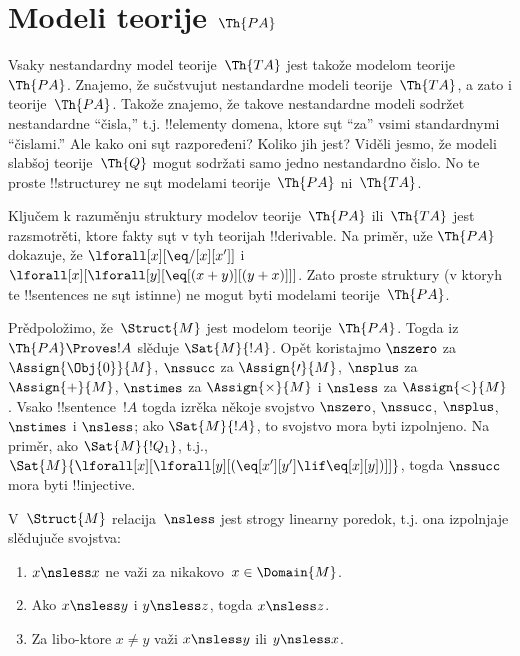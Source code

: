 \documentclass[../../../include/open-logic-section]{subfiles}
\begin{document}
\section{Modeli teorije $\Th{PA}$}

\begin{explain}
Vsaky nestandardny model teorije~$\Th{TA}$ jest takože modelom
teorije~$\Th{PA}$. Znajemo, že sučstvujut nestandardne modeli
teorije~$\Th{TA}$, a zato i teorije~$\Th{PA}$. Takože znajemo, že takove
nestandardne modeli sodržet nestandardne ``čisla,'' t.j. !!{element}y
domena, ktore sųt ``za'' vsimi standardnymi ``čislami.'' Ale kako oni
sųt razpoređeni? Koliko jih jest? Viděli jesmo, že modeli slabšoj
teorije~$\Th{Q}$ mogut sodržati samo jedno nestandardno čislo. No te
proste !!{structure}y ne sųt modelami teorije~$\Th{PA}$ ni~$\Th{TA}$.

Ključem k razuměnju struktury modelov teorije~$\Th{PA}$ ili~$\Th{TA}$
jest razsmotrěti, ktore fakty sųt v tyh teorijah !!{derivable}. Na
priměr, uže $\Th{PA}$ dokazuje, že
$\lforall[x][\eq/[x][x']]$ i
$\lforall[x][\lforall[y][\eq[(x+y)][(y+x)]]]$. Zato proste struktury
(v ktoryh te !!{sentence}s ne sųt istinne) ne mogut byti modelami
teorije~$\Th{PA}$.

Prědpoložimo, že~$\Struct{M}$ jest modelom teorije~$\Th{PA}$. Togda iz
$\Th{PA} \Proves !A$ slěduje $\Sat{M}{!A}$. Opět koristajmo $\nszero$
za $\Assign{\Obj{0}}{M}$, $\nssucc$ za $\Assign{\prime}{M}$, $\nsplus$
za $\Assign{+}{M}$, $\nstimes$ za $\Assign{\times}{M}$ i $\nsless$ za
$\Assign{<}{M}$. Vsako !!{sentence}~$!A$ togda izrěka někoje svojstvo
$\nszero$, $\nssucc$, $\nsplus$, $\nstimes$ i $\nsless$; ako
$\Sat{M}{!A}$, to svojstvo mora byti izpolnjeno. Na priměr, ako
$\Sat{M}{!Q_1}$, t.j.,
$\Sat{M}{\lforall[x][\lforall[y][(\eq[x'][y'] \lif \eq[x][y])]]}$,
togda $\nssucc$ mora byti !!{injective}.
\end{explain}

\begin{prop}
V~$\Struct{M}$ relacija~$\nsless$ jest strogy linearny poredok, t.j.
ona izpolnjaje slědujuče svojstva:
\begin{enumerate}
\item $x \nsless x$ ne važi za nikakovo~$x \in \Domain{M}$.
\item Ako $x \nsless y$ i $y \nsless z$, togda $x \nsless z$.
\item Za libo-ktore $x \neq y$ važi $x \nsless y$ ili $y \nsless x$.
\end{enumerate}
\end{prop}
\end{document}
